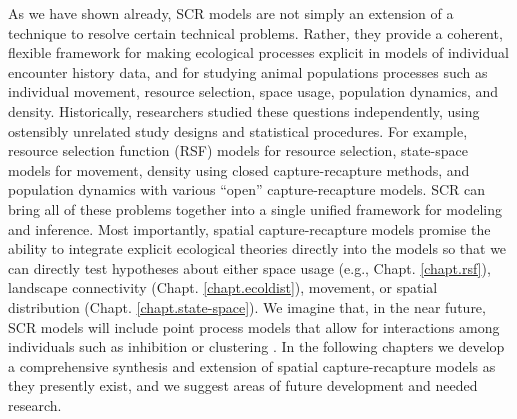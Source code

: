 As we have shown already, SCR models are not simply an extension of a technique to
resolve certain technical problems.  Rather, they provide a coherent, flexible
framework for making ecological processes explicit in models of
individual encounter history data, and for studying animal populations
processes such as individual movement, resource selection, space
usage, population dynamics, and density. Historically, researchers studied
these questions independently, using ostensibly unrelated study designs
and statistical procedures. For example, resource selection function
(RSF) models for resource selection, state-space models for movement,
density using closed capture-recapture methods, and population
dynamics with various ``open'' capture-recapture models.  SCR can
bring all of these problems together into a single unified framework
for modeling and inference.
Most importantly, spatial capture-recapture models promise the ability
to integrate explicit ecological theories directly into the models so
that we can directly test hypotheses about either space usage (e.g.,
Chapt. \ref{chapt.rsf}), landscape connectivity
(Chapt. \ref{chapt.ecoldist}), movement, or spatial distribution
(Chapt. \ref{chapt.state-space}). We imagine that, in the near future,
SCR models will include point process models that allow for
interactions among individuals such as inhibition or clustering
\citep{reich_etal:2012}. 
In the following chapters we develop a comprehensive synthesis and
extension of spatial capture-recapture models as they presently
exist, and we suggest areas of future development and needed research.





